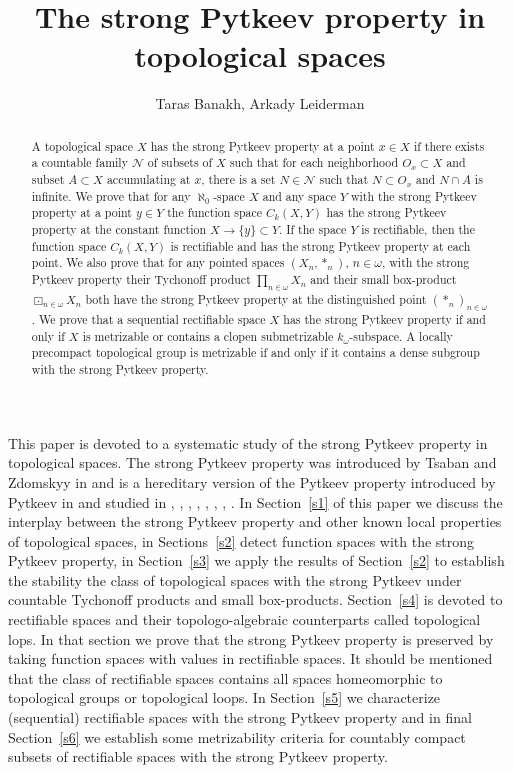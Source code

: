 \documentclass{amsart}
\title{The strong Pytkeev property in topological spaces}
\author{Taras Banakh, Arkady Leiderman}
\theoremstyle{definition}
\begin{document}
\begin{abstract}
A topological space $X$ has the strong Pytkeev property at a point $x\in X$ if there exists a countable family $\mathcal N$ of subsets of $X$ such that for each neighborhood $O_x\subset X$ and subset $A\subset X$ accumulating at $x$, there is a set $N\in\mathcal N$ such that $N\subset O_x$ and $N\cap A$ is infinite. We prove that for any $\aleph_0$-space $X$ and any space $Y$ with the strong Pytkeev property at a point $y\in Y$ the function space $C_k(X,Y)$ has the strong Pytkeev property at the
constant function $X\to \{y\}\subset Y$. If the space $Y$ is rectifiable, then the function space $C_k(X,Y)$ is rectifiable and has the strong Pytkeev property at each point. We also prove that for any pointed spaces $(X_n,*_n)$, $n\in{\omega}$, with the strong Pytkeev property their Tychonoff product $\prod_{n\in{\omega}}X_n$ and their small box-product ${\boxdot}_{n\in{\omega}}X_n$ both have the strong Pytkeev property at the distinguished point $(*_n)_{n\in{\omega}}$. We prove that a sequential rectifiable space $X$ has the strong Pytkeev property if and only if $X$ is metrizable or contains a clopen submetrizable $k_\omega$-subspace. A locally precompact topological group is metrizable if and only if it contains a dense subgroup with the strong Pytkeev property.
\end{abstract}
\maketitle

This paper is devoted to a systematic study of the strong Pytkeev property in topological spaces.
The strong Pytkeev property was introduced by Tsaban and Zdomskyy in \cite{TZ} and is a hereditary version of the Pytkeev property introduced by Pytkeev in \cite{Pyt} and studied in \cite{BM}, \cite{FlD}, \cite{Koc}, \cite{MT}, \cite{PP}, \cite{MSak2}, \cite{MSak06},  \cite{ST}. In Section~\ref{s1} of this paper we discuss the interplay between the strong Pytkeev property and other known local properties of topological spaces, in Sections~\ref{s2} detect function spaces with the strong Pytkeev property, in Section~\ref{s3} we apply the results of Section~\ref{s2} to establish the stability the class of topological spaces with the strong Pytkeev under countable Tychonoff products and small box-products. Section~\ref{s4} is devoted to rectifiable spaces and their topologo-algebraic counterparts called topological lops.  In that section we prove that the strong Pytkeev property is preserved by taking function spaces with values in rectifiable spaces. It should be mentioned that the class of rectifiable spaces contains all spaces homeomorphic to topological groups or topological loops. In Section~\ref{s5} we characterize (sequential) rectifiable spaces with the strong Pytkeev property and in final Section~\ref{s6} we establish some metrizability criteria for countably compact subsets of rectifiable spaces with the strong Pytkeev property.
\end{document}
